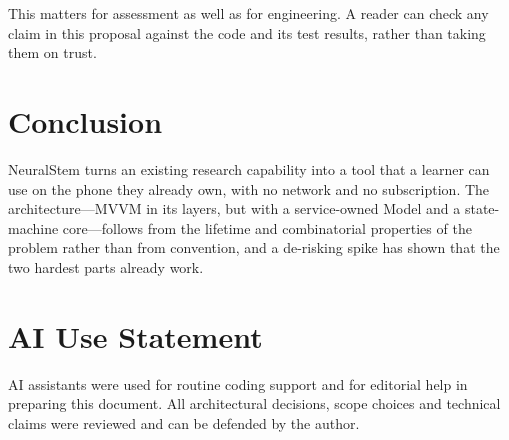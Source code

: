 \documentclass[letterpaper]{article} %
\begin{document}
This matters for assessment as well as for engineering. A reader can check any
claim in this proposal against the code and its test results, rather than
taking them on trust.

\section{Conclusion}

NeuralStem turns an existing research capability into a tool that a learner can
use on the phone they already own, with no network and no subscription. The
architecture---MVVM in its layers, but with a service-owned Model and a
state-machine core---follows from the lifetime and combinatorial properties of
the problem rather than from convention, and a de-risking spike has shown that
the two hardest parts already work.

\section*{AI Use Statement}
AI assistants were used for routine coding support and for editorial help in
preparing this document. All architectural decisions, scope choices and
technical claims were reviewed and can be defended by the author.
\end{document}
